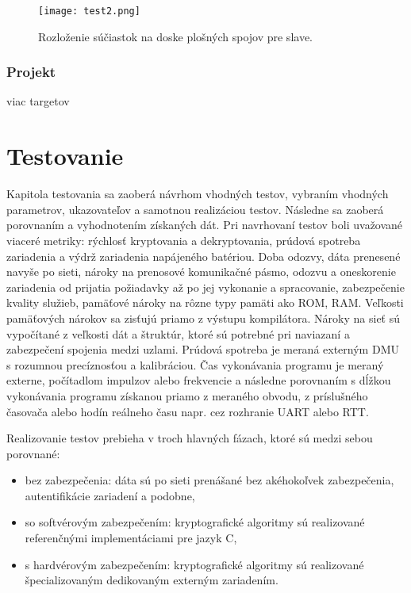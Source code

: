 \documentclass[12pt,a4wide,oneside,openright]{report}
\begin{document}
\begin{figure*}[h]
	\centering
	\texttt{[image: test2.png]}
	\caption{Rozloženie súčiastok na doske plošných spojov pre slave.}
	\label{f:board_slave_layout}
\end{figure*}

\subsection{Projekt}
viac targetov


\chapter{Testovanie} \label{s_testing}
Kapitola testovania sa zaoberá návrhom vhodných testov, vybraním vhodných parametrov, ukazovateľov a samotnou realizáciou testov. Následne sa zaoberá porovnaním a vyhodnotením získaných dát.
Pri navrhovaní testov boli uvažované viaceré metriky: rýchlosť kryptovania a dekryptovania, prúdová spotreba zariadenia a výdrž zariadenia napájeného batériou. Doba odozvy, dáta prenesené navyše po sieti, nároky na prenosové komunikačné pásmo, odozvu a oneskorenie zariadenia od prijatia požiadavky až po jej vykonanie a spracovanie, zabezpečenie kvality služieb, pamäťové nároky na rôzne typy pamäti ako ROM, RAM.
Veľkosti pamäťových nárokov sa zisťujú priamo z výstupu kompilátora. Nároky na sieť sú vypočítané z veľkosti dát a štruktúr, ktoré sú potrebné pri naviazaní a zabezpečení spojenia medzi uzlami.
Prúdová spotreba je meraná externým DMU s rozumnou precíznosťou a kalibráciou.
Čas vykonávania programu je meraný externe, počítadlom impulzov alebo frekvencie a následne porovnaním s dĺžkou vykonávania programu získanou priamo z meraného obvodu, z príslušného časovača alebo hodín reálneho času napr. cez rozhranie UART alebo RTT.

Realizovanie testov prebieha v troch hlavných fázach, ktoré sú medzi sebou porovnané:
\begin{itemize}
	\item bez zabezpečenia: dáta sú po sieti prenášané bez akéhokoľvek zabezpečenia, autentifikácie zariadení a podobne,
	\item so softvérovým zabezpečením: kryptografické algoritmy sú realizované referenčnými implementáciami pre jazyk C,
	\item s hardvérovým zabezpečením: kryptografické algoritmy sú realizované špecializovaným dedikovaným externým zariadením.
\end{itemize}
\onehalfspacing
\end{document}
